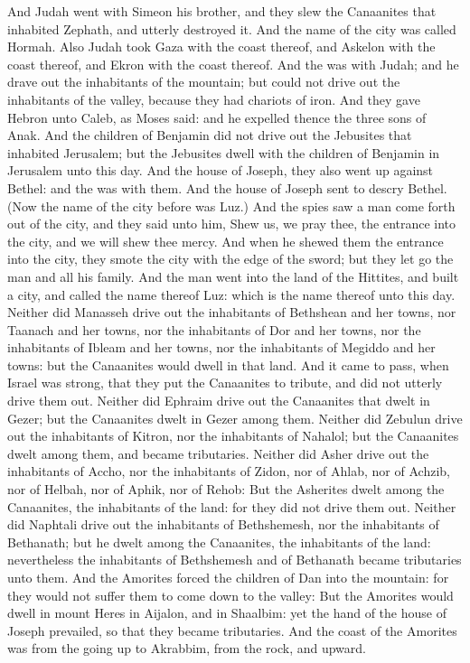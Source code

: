 \begin{biblechapter}
\verse And Judah went with Simeon his brother, and they slew the Canaanites that inhabited Zephath, and utterly destroyed it. And the name of the city was called Hormah.
\verse Also Judah took Gaza with the coast thereof, and Askelon with the coast thereof, and Ekron with the coast thereof.
\verse And the \LORD was with Judah; and he drave out the inhabitants of the mountain; but could not drive out the inhabitants of the valley, because they had chariots of iron.
\verse And they gave Hebron unto Caleb, as Moses said: and he expelled thence the three sons of Anak.
\verse And the children of Benjamin did not drive out the Jebusites that inhabited Jerusalem; but the Jebusites dwell with the children of Benjamin in Jerusalem unto this day.
\verse And the house of Joseph, they also went up against Bethel: and the \LORD was with them.
\verse And the house of Joseph sent to descry Bethel. (Now the name of the city before was Luz.)
\verse And the spies saw a man come forth out of the city, and they said unto him, Shew us, we pray thee, the entrance into the city, and we will shew thee mercy.
\verse And when he shewed them the entrance into the city, they smote the city with the edge of the sword; but they let go the man and all his family.
\verse And the man went into the land of the Hittites, and built a city, and called the name thereof Luz: which is the name thereof unto this day.
\verse Neither did Manasseh drive out the inhabitants of Bethshean and her towns, nor Taanach and her towns, nor the inhabitants of Dor and her towns, nor the inhabitants of Ibleam and her towns, nor the inhabitants of Megiddo and her towns: but the Canaanites would dwell in that land.
\verse And it came to pass, when Israel was strong, that they put the Canaanites to tribute, and did not utterly drive them out.
\verse Neither did Ephraim drive out the Canaanites that dwelt in Gezer; but the Canaanites dwelt in Gezer among them.
\verse Neither did Zebulun drive out the inhabitants of Kitron, nor the inhabitants of Nahalol; but the Canaanites dwelt among them, and became tributaries.
\verse Neither did Asher drive out the inhabitants of Accho, nor the inhabitants of Zidon, nor of Ahlab, nor of Achzib, nor of Helbah, nor of Aphik, nor of Rehob:
\verse But the Asherites dwelt among the Canaanites, the inhabitants of the land: for they did not drive them out.
\verse Neither did Naphtali drive out the inhabitants of Bethshemesh, nor the inhabitants of Bethanath; but he dwelt among the Canaanites, the inhabitants of the land: nevertheless the inhabitants of Bethshemesh and of Bethanath became tributaries unto them.
\verse And the Amorites forced the children of Dan into the mountain: for they would not suffer them to come down to the valley:
\verse But the Amorites would dwell in mount Heres in Aijalon, and in Shaalbim: yet the hand of the house of Joseph prevailed, so that they became tributaries.
\verse And the coast of the Amorites was from the going up to Akrabbim, from the rock, and upward.
\end{biblechapter}

